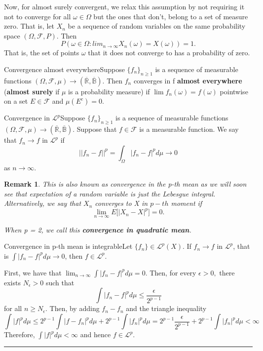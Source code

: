 \documentclass[twoside]{article}
\newtheorem{remark}[theorem]{Remark}
\newenvironment{proof}{{\bf Proof:}}{\hfill\rule{2mm}{2mm}}
\newcommand{\sigmalgebra}{\mathcal{F}}
\begin{document}
Now, for almost surely convergent, we relax this assumption by not requiring it not to converge for all $\omega \in \Omega$ but the ones that don't, belong to a set of measure zero.
That is, let $X_n$ be a sequence of random variables on the same probability space $(\Omega, \mathcal{F}, P).$ Then 
$$
P(\omega \in \Omega: lim_{n \rightarrow \infty}X_n(\omega) = X(\omega)) = 1.
$$
That is, the set of points $\omega$ that it does not converge to has a probability of zero.


\begin{definition_exam}{Convergence almost everywhere}{}Suppose $\{f_n\}_{n \geq 1}$ is a sequence of measurable functions $(\Omega, \sigmalgebra, \mu) \rightarrow (\overline{\mathbb{R}}, \overline{\mathbb{B}})$. Then $f_n$ converges in f \textbf{almost everywhere} (\textbf{almost surely} if $\mu$ is a probability measure) if $\lim f_n(\omega) = f(\omega)$ pointwise on a set $E \in \sigmalgebra$ and $\mu(E^c) = 0.$
\end{definition_exam}



\begin{definition_exam}{Convergence in $\mathcal{L}^p$}{}Suppose $\{f_n\}_{n \geq 1}$ is a sequence of measurable functions $(\Omega, \sigmalgebra, \mu) \rightarrow (\overline{\mathbb{R}}, \overline{\mathbb{B}})$. Suppose that $f \in \sigmalgebra$ is a measurable function. We say that $f_n \rightarrow f$ in $\mathcal{L}^p$ if $$||f_n - f||^p = \int_{\Omega}|f_n - f|^pd\mu \rightarrow 0$$ as $n \rightarrow \infty.$
\end{definition_exam}

\begin{remark}This is also known as convergence in the p-th mean as we will soon see that expectation of a random variable is just the Lebesgue integral. Alternatively, we say that $X_n$ converges to X in $p-th$ moment if 
$$
\lim_{n \rightarrow \infty}E\bigg[|X_n - X|^p\bigg] = 0.
$$

When p = 2, we call this \textbf{convergence in quadratic mean}.
\end{remark}


\begin{proposition_exam}{Convergence in p-th mean is integrable}{}Let $\{f_n\} \in \mathcal{L}^p(X).$ If $f_n \rightarrow f$ in $\mathcal{L}^p$, that is $\int|f_n - f|^pd\mu \rightarrow 0$, then $f \in \mathcal{L}^p.$
\end{proposition_exam}

\begin{proof} First, we have that $\lim_{n \rightarrow \infty}\int |f_n - f|^pd\mu = 0.$ Then, for every $\epsilon >0,$ there exists $N_{\epsilon} > 0$ such that 
$$
\int |f_n - f|^pd\mu \leq \frac{\epsilon}{2^{p-1}}
$$
for all $n \geq N_{\epsilon}.$ Then, by adding $f_n - f_n$ and the triangle inequality 
$$
\int |f|^pd\mu \leq 2^{p - 1}\int |f - f_n|^pd\mu + 2^{p - 1}\int |f_n|^pd\mu = 2^{p - 1}\frac{\epsilon}{2^{p - 1}} + 2^{p - 1}\int |f_n|^pd\mu < \infty
$$
Therefore, $\int |f|^pd\mu < \infty$ and hence $f \in \mathcal{L}^p.$
\end{proof}
\end{document}

